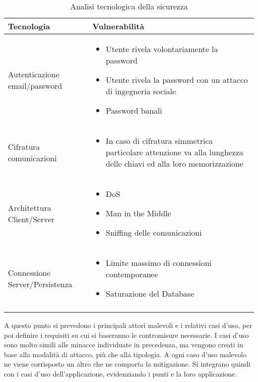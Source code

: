 \begin{longtable} {|P{4cm}|P{12cm}|}
        \hline
        Tecnologia                     & Vulnerabilità                                                                            \\
        \hline
        \endhead
        Autenticazione email/password  &
        \begin{itemize}
            \item Utente rivela volontariamente la password
            \item Utente rivela la password con un attacco di ingegneria sociale
            \item Password banali
        \end{itemize}                                                       \\
        \hline
        Cifratura comunicazioni        &
        \begin{itemize}
            \item In caso di cifratura simmetrica particolare attenzione va alla lunghezza delle chiavi ed alla loro memorizzazione
        \end{itemize} \\
        \hline
        Architettura Client/Server     &
        \begin{itemize}
            \item DoS
            \item Man in the Middle
            \item Sniffing delle comunicazioni
        \end{itemize}                                                                                       \\
        \hline
        Connessione Server/Persistenza & \begin{itemize}
                                             \item Limite massimo di connessioni contemporanee
                                             \item Saturazione del Database
                                         \end{itemize}                                         \\
        \hline
    \caption{Analisi tecnologica della sicurezza}
\end{longtable}

A questo punto si prevedono i principali attori malevoli e i relativi casi d'uso,
per poi definire i requisiti su cui si baseranno le contromisure necessarie.
I casi d'uso sono molto simili alle minacce individuate in precedenza,
ma vengono creati in base alla modalità di attacco, più che alla tipologia.
A ogni caso d'uso malevolo ne viene corrisposto un altro che ne comporta la mitigazione.
Si integrano quindi con i casi d'uso dell'applicazione,
evidenziando i punti e la loro applicazione.\\
\clearpage

